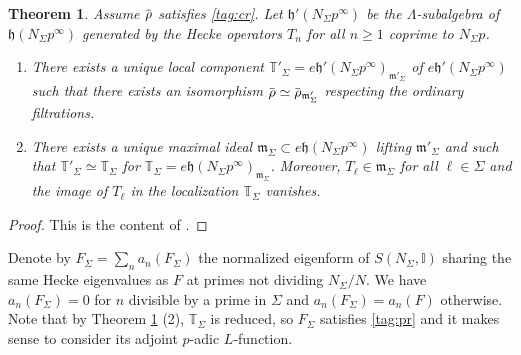 \documentclass[12pt]{amsart}
\newcommand\bI{\mathbb{I}}
\newcommand\bT{\mathbb{T}}
\newcommand\gh{\mathfrak{h}}
\newcommand\gm{\mathfrak{m}}
\newcommand{\ob}[1]{\mkern 1.5mu\overline{\mkern-1.5mu#1\mkern-1.5mu}\mkern 1.5mu}
\theoremstyle{defstyle}
\theoremstyle{thmstyle}
\newtheorem{theorem}[subsubsection]{Theorem}
\begin{document}
\begin{theorem}\label{thm:wiles_Sigma}
	Assume $\ob{\rho}$ satisfies \eqref{tag:cr}. Let $\gh'(N_\Sigma p^\infty)$ be the $\Lambda$-subalgebra of $\gh(N_\Sigma p^\infty)$ generated by the Hecke operators $T_n$ for all $n\geq 1$ coprime to $N_\Sigma p$.
	\begin{enumerate}
		\item There exists a unique local component $\bT'_\Sigma=e\gh'(N_\Sigma p^\infty)_{\gm'_\Sigma}$ of $e\gh'(N_\Sigma p^\infty)$ such that there exists an isomorphism $\ob{\rho}\simeq\ob{\rho}_{\gm'_\Sigma}$ respecting the ordinary filtrations.
		\item There exists a unique maximal ideal $\gm_\Sigma\subset e\gh(N_\Sigma p^\infty)$ lifting $\gm'_\Sigma$ and such that $\bT'_\Sigma\simeq\bT_\Sigma$ for $\bT_\Sigma=e\gh(N_\Sigma p^\infty)_{\gm_\Sigma}$. Moreover, $T_\ell\in\gm_\Sigma$ for all $\ell\in\Sigma$ and the image of $T_\ell$ in the localization $\bT_\Sigma$ vanishes. 
	\end{enumerate}
\end{theorem}
\begin{proof}
	This is the content of \cite[Thm. 2.4.1 and Prop. 2.4.2]{emerton2006variation}.
\end{proof}
Denote by $F_\Sigma=\sum_na_n(F_\Sigma)$ the normalized eigenform of $S(N_\Sigma,\bI)$ sharing the same Hecke eigenvalues as $F$ at primes not dividing $N_\Sigma/N$. We have $a_n(F_\Sigma)=0$ for $n$ divisible by a prime in $\Sigma$ and $a_n(F_\Sigma)=a_n(F)$ otherwise. Note that by Theorem \ref{thm:wiles_Sigma} (2), $\bT_\Sigma$ is reduced, so $F_\Sigma$ satisfies \eqref{tag:pr} and it makes sense to consider its adjoint $p$-adic $L$-function.
\end{document}
